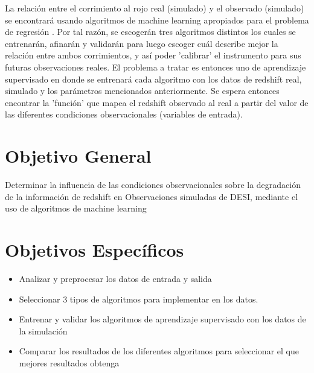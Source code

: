 \documentclass[12pt]{article}
\begin{document}
La relación entre el corrimiento al rojo real (simulado) y el observado (simulado) se encontrará usando algoritmos de machine learning apropiados para el problema de regresión \cite{bishop2006pattern}. Por tal razón, se escogerán tres algoritmos distintos los cuales se entrenarán, afinarán y validarán para luego escoger cuál describe mejor la relación entre ambos corrimientos, y así poder 'calibrar' el instrumento para sus futuras observaciones reales. El problema a tratar es entonces uno de aprendizaje supervisado en donde se entrenará cada algoritmo con los datos de redshift real, simulado y los parámetros mencionados anteriormente. Se espera entonces encontrar la 'función' que mapea el redshift observado al real a partir del valor de las diferentes condiciones observacionales (variables de entrada). 







\section{Objetivo General}


Determinar la influencia de las condiciones observacionales sobre la degradación de la información de redshift en Observaciones simuladas de DESI, mediante el uso de algoritmos de machine learning

\section{Objetivos Específicos}


\begin{itemize}
	\item Analizar y preprocesar los datos de entrada y salida 
	\item Seleccionar 3 tipos de algoritmos para implementar en los datos.
	\item Entrenar y validar los algoritmos de aprendizaje supervisado con los datos de la simulación
	\item Comparar los resultados de los diferentes algoritmos para seleccionar el que mejores resultados obtenga
\end{itemize}
\end{document}
